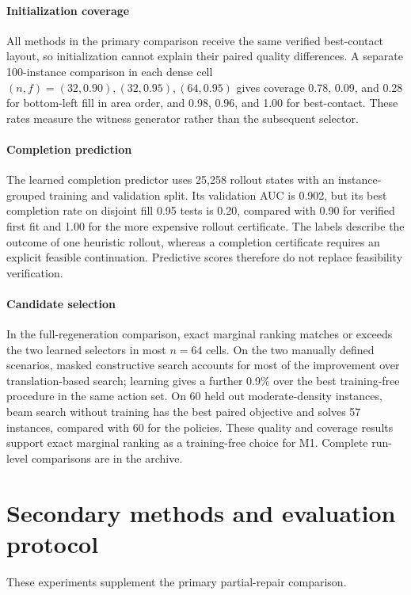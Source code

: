 \documentclass[11pt]{article}
\begin{document}
\paragraph{Initialization coverage}
All methods in the primary comparison receive the same verified best-contact
layout, so initialization cannot explain their paired quality differences.
A separate 100-instance comparison in each dense cell
$(n,f)=(32,0.90),(32,0.95),(64,0.95)$ gives coverage 0.78, 0.09, and 0.28
for bottom-left fill in area order, and 0.98, 0.96, and 1.00 for best-contact.
These rates measure the witness generator rather than the subsequent selector.

\paragraph{Completion prediction}
The learned completion predictor uses 25,258 rollout states with an
instance-grouped training and validation split. Its validation AUC is 0.902,
but its best completion rate on disjoint fill 0.95 tests is 0.20, compared
with 0.90 for verified first fit and 1.00 for the more expensive rollout
certificate. The labels describe the outcome of one heuristic rollout,
whereas a completion certificate requires an explicit feasible continuation.
Predictive scores therefore do not replace feasibility verification.

\paragraph{Candidate selection}
In the full-regeneration comparison, exact marginal ranking matches or
exceeds the two learned selectors in most $n=64$ cells. On the two manually
defined scenarios, masked constructive search accounts for most of the
improvement over translation-based search; learning gives a further 0.9\%
over the best training-free procedure in the same action set. On 60 held out
moderate-density instances, beam search without training has the best paired
objective and solves 57 instances, compared with 60 for the policies.
These quality and coverage results support exact marginal ranking as a
training-free choice for M1. Complete run-level comparisons are in the archive.

\section{Secondary methods and evaluation protocol}
\label{app:secondaryprotocol}
These experiments supplement the primary partial-repair comparison.
\end{document}
